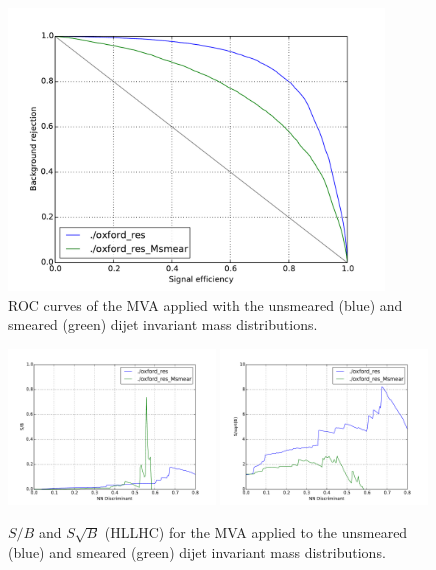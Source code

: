 \documentclass[12pt]{article}
\begin{document}
\begin{figure}[h]
\begin{center}
\includegraphics[width=0.89\textwidth]{plots/Msmear/roc.pdf}
\caption{ROC curves of the MVA applied with the unsmeared (blue) and smeared (green) dijet invariant mass distributions.}
\label{fig:smearedROC}
\end{center}
\end{figure}
            
       
\begin{figure}[h]
\begin{center}
\includegraphics[width=0.49\textwidth]{plots/Msmear/sb.pdf}
\includegraphics[width=0.49\textwidth]{plots/Msmear/ssb.pdf}
\caption{$S/B$ and $S\sqrt{B}$ (HL\-LHC) for the MVA applied to the unsmeared (blue) and smeared (green) dijet invariant mass distributions.}
\label{fig:smearedSB}
\end{center}
\end{figure}
\clearpage
\end{document}
